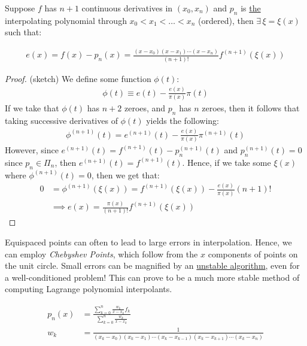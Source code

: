 \documentclass{article}
\begin{document}
\gap
{} Suppose $f$ has $n+1$ continuous derivatives in $(x_0, x_n)$ and $p_n$ is \underline{the} interpolating polynomial through $x_0 < x_1 < \ldots < x_n$ (ordered), then $\exists\, \xi = \xi(x)$ such that:

\begin{align*}
  e(x) = f(x) - p_n(x) = \frac{(x-x_0)(x-x_1) \cdots (x-x_n)}{(n+1)!}f^{(n+1)}(\xi(x))
\end{align*}

\begin{proof} (sketch)
  We define some function $\phi(t)$:
  \begin{align*}
    \phi(t) \equiv e(t) - \frac{e(x)}{\pi(x)}\pi(t)
  \end{align*}
  If we take that $\phi(t)$ has $n+2$ zeroes, and $p_n$ has $n$ zeroes, then it follows that taking successive derivatives of $\phi(t)$ yields the following:
  \begin{align*}
    \phi^{(n+1)}(t) = e^{(n + 1)}(t) - \frac{e(x)}{\pi(x)}\pi^{(n + 1)}(t)
  \end{align*}
  However, since $e^{(n + 1)}(t) = f^{(n + 1)}(t) - p_n^{(n + 1)}(t)$ and $p_n^{(n + 1)}(t) = 0$ since $p_n \in \Pi_n$, then $e^{(n + 1)}(t) = f^{(n + 1)}(t)$. Hence, if we take some $\xi(x)$ where $\phi^{(n + 1)}(t) = 0$, then we get that:
  \begin{align*}
    0 &= \phi^{(n + 1)}(\xi(x)) = f^{(n + 1)}(\xi(x)) - \frac{e(x)}{\pi(x)}(n + 1)!\\
      &\implies e(x) = \frac{\pi(x)}{(n+1)!}f^{(n + 1)}(\xi(x))
  \end{align*}
\end{proof}

 Equispaced points can often to lead to large errors in interpolation. Hence, we can employ \textit{Chebyshev Points}, which follow from the $x$ components of points on the unit circle.
\gap
{} Small errors can be magnified by an \underline{unstable algorithm}, even for a well-conditioned problem!
\gap
{} This can prove to be a much more stable method of computing Lagrange polynomial interpolants.

\begin{align*}
  p_n(x) &= \frac{\sum_{k=0}^{n} \frac{w_k}{x-x_k} f_k}{\sum_{k=0}^{n} \frac{w_k}{x-x_k}}\\
  w_k &= \frac{1}{(x_k-x_0)(x_k - x_1) \cdots (x_k - x_{k-1}) (x_k-x_{k+1}) \cdots (x_k - x_n)}
\end{align*}
\end{document}
